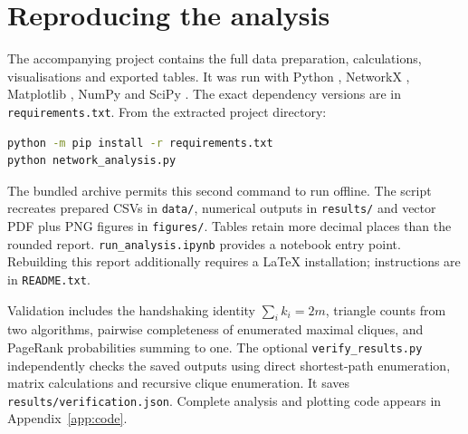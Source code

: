 \documentclass[11pt,a4paper]{article}
\begin{document}
\section{Reproducing the analysis}
The accompanying project contains the full data preparation, calculations,
visualisations and exported tables. It was run with Python \PythonVersion{},
NetworkX \NetworkXVersion{}, Matplotlib \MatplotlibVersion{}, NumPy \NumpyVersion{}
and SciPy \ScipyVersion{}. The exact dependency versions are in
\texttt{requirements.txt}. From the extracted project directory:
\begin{lstlisting}[language=bash,numbers=none]
python -m pip install -r requirements.txt
python network_analysis.py
\end{lstlisting}
The bundled archive permits this second command to run offline. The script
recreates prepared CSVs in \texttt{data/}, numerical outputs in \texttt{results/}
and vector PDF plus PNG figures in \texttt{figures/}. Tables retain more decimal
places than the rounded report. \texttt{run\_analysis.ipynb} provides a notebook
entry point. Rebuilding this report additionally requires a LaTeX installation;
instructions are in \texttt{README.txt}.

Validation includes the handshaking identity $\sum_i k_i=2m$, triangle counts
from two algorithms, pairwise completeness of enumerated maximal cliques,
and PageRank probabilities summing to one. The optional
\texttt{verify\_results.py} independently checks the saved outputs using
direct shortest-path enumeration, matrix calculations and recursive clique
enumeration. It saves \texttt{results/verification.json}.
Complete analysis and plotting code
appears in Appendix~\ref{app:code}.
\end{document}
